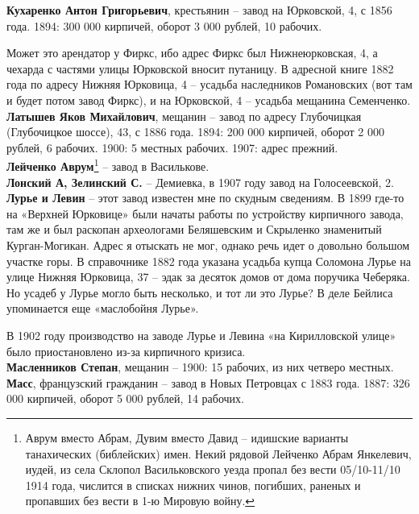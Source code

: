 \noindent\textbf{Кухаренко Антон Григорьевич}, крестьянин – завод на Юрковской, 4, с 1856 года. 1894: 300 000 кирпичей, оборот 3 000 рублей, 10 рабочих. 

Может это арендатор у Фиркс, ибо адрес Фиркс был Нижнеюрковская, 4, а чехарда с частями улицы Юрковской вносит путаницу. В адресной книге 1882 года по адресу Нижняя Юрковица, 4 – усадьба наследников Романовских (вот там и будет потом завод Фиркс), и на Юрковской, 4 – усадьба мещанина Семенченко.\\

\noindent\textbf{Латышев Яков Михайлович}, мещанин – завод по адресу Глубочицкая (Глубочицкое шоссе), 43, с 1886 года. 1894: 200 000 кирпичей, оборот 2 000 рублей, 6 рабочих. 1900: 5 местных рабочих. 1907: адрес прежний.\\

\noindent\textbf{Лейченко Аврум}\footnote{Аврум вместо Абрам, Дувим вместо Давид – идишские варианты танахических (библейских) имен. Некий рядовой Лейченко Абрам Янкелевич, иудей, из села Склопол Васильковского уезда пропал без вести 05/10-11/10 1914 года, числится в списках нижних чинов, погибших, раненых и пропавших без вести в 1-ю Мировую войну.} – завод в Василькове.\\

\noindent\textbf{Лонский А, Зелинский С.} – Демиевка, в 1907 году завод на Голосеевской, 2.\\ 

\noindent\textbf{Лурье и Левин} – этот завод известен мне по скудным сведениям. В 1899 где-то на «Верхней Юрковице» были начаты работы по устройству кирпичного завода, там же и был раскопан археологами Беляшевским и Скрыленко знаменитый Курган-Могикан. Адрес я отыскать не мог, однако речь идет о довольно большом участке горы. В справочнике 1882 года указана усадьба купца Соломона Лурье на улице Нижняя Юрковица, 37 – эдак за десяток домов от дома поручика Чеберяка. Но усадеб у Лурье могло быть несколько, и тот ли это Лурье? В деле Бейлиса упоминается еще «маслобойня Лурье».

В 1902 году производство на заводе Лурье и Левина «на Кирилловской улице» было приостановлено из-за кирпичного кризиса.\\

\noindent\textbf{Масленников Степан}, мещанин – 1900: 15 рабочих, из них четверо местных.\\ 

\noindent\textbf{Масс}, французский гражданин – завод в Новых Петровцах с 1883 года. 1887: 326 000 кирпичей, оборот 5 000 рублей, 14 рабочих.\\

